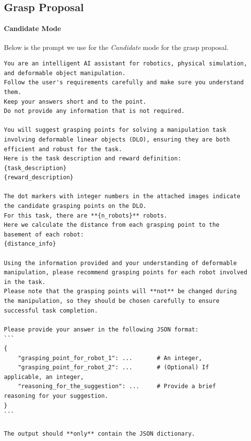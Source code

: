\subsection{Grasp Proposal}
\paragraph{Candidate Mode} Below is the prompt we use for the \textit{Candidate} mode for the grasp proposal. 
\begin{lstlisting}[style=markdownstyle]
You are an intelligent AI assistant for robotics, physical simulation, and deformable object manipulation. 
Follow the user's requirements carefully and make sure you understand them. 
Keep your answers short and to the point. 
Do not provide any information that is not required. 

You will suggest grasping points for solving a manipulation task involving deformable linear objects (DLO), ensuring they are both efficient and robust for the task.
Here is the task description and reward definition:
{task_description}
{reward_description}

The dot markers with integer numbers in the attached images indicate the candidate grasping points on the DLO.
For this task, there are **{n_robots}** robots.
Here we calculate the distance from each grasping point to the basement of each robot:
{distance_info}

Using the information provided and your understanding of deformable manipulation, please recommend grasping points for each robot involved in the task. 
Please note that the grasping points will **not** be changed during the manipulation, so they should be chosen carefully to ensure successful task completion.

Please provide your answer in the following JSON format:
```
{
    "grasping_point_for_robot_1": ...       # An integer,
    "grasping_point_for_robot_2": ...       # (Optional) If applicable, an integer,
    "reasoning_for_the_suggestion": ...     # Provide a brief reasoning for your suggestion.
}
```

The output should **only** contain the JSON dictionary.
\end{lstlisting}

